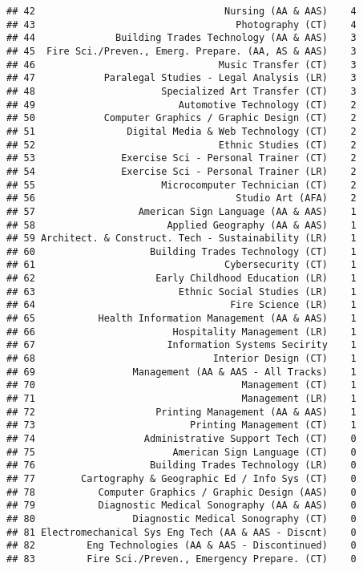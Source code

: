 \documentclass[]{article}
\begin{document}
\begin{verbatim}
## 42                                 Nursing (AA & AAS)    4
## 43                                   Photography (CT)    4
## 44              Building Trades Technology (AA & AAS)    3
## 45  Fire Sci./Preven., Emerg. Prepare. (AA, AS & AAS)    3
## 46                                Music Transfer (CT)    3
## 47            Paralegal Studies - Legal Analysis (LR)    3
## 48                      Specialized Art Transfer (CT)    3
## 49                         Automotive Technology (CT)    2
## 50            Computer Graphics / Graphic Design (CT)    2
## 51                Digital Media & Web Technology (CT)    2
## 52                                Ethnic Studies (CT)    2
## 53               Exercise Sci - Personal Trainer (CT)    2
## 54               Exercise Sci - Personal Trainer (LR)    2
## 55                      Microcomputer Technician (CT)    2
## 56                                   Studio Art (AFA)    2
## 57                  American Sign Language (AA & AAS)    1
## 58                       Applied Geography (AA & AAS)    1
## 59 Architect. & Construct. Tech - Sustainability (LR)    1
## 60                    Building Trades Technology (CT)    1
## 61                                 Cybersecurity (CT)    1
## 62                     Early Childhood Education (LR)    1
## 63                         Ethnic Social Studies (LR)    1
## 64                                  Fire Science (LR)    1
## 65           Health Information Management (AA & AAS)    1
## 66                        Hospitality Management (LR)    1
## 67                       Information Systems Secirity    1
## 68                               Interior Design (CT)    1
## 69                 Management (AA & AAS - All Tracks)    1
## 70                                    Management (CT)    1
## 71                                    Management (LR)    1
## 72                     Printing Management (AA & AAS)    1
## 73                           Printing Management (CT)    1
## 74                   Administrative Support Tech (CT)    0
## 75                        American Sign Language (CT)    0
## 76                    Building Trades Technology (LR)    0
## 77        Cartography & Geographic Ed / Info Sys (CT)    0
## 78           Computer Graphics / Graphic Design (AAS)    0
## 79           Diagnostic Medical Sonography (AA & AAS)    0
## 80                 Diagnostic Medical Sonography (CT)    0
## 81 Electromechanical Sys Eng Tech (AA & AAS - Discnt)    0
## 82         Eng Technologies (AA & AAS - Discontinued)    0
## 83         Fire Sci./Preven., Emergency Prepare. (CT)    0

\end{verbatim}
\end{document}
